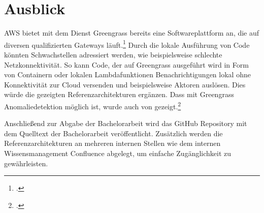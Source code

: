





\section{Ausblick}

\ac{AWS} bietet mit dem Dienst Greengrass bereits eine Softwareplattform an, die auf diversen qualifizierten Gateways läuft.\footcite[Vgl. auch im Folgenden][]{AmazonWebServicesInc..o.J.bu} Durch die lokale Ausführung von Code könnten Schwachstellen adressiert werden, wie beispielsweise schlechte Netzkonnektivität. So kann Code, der auf Greengrass ausgeführt wird in Form von Containern oder lokalen Lambdafunktionen Benachrichtigungen lokal ohne Konnektivität zur Cloud versenden und beispielsweise Aktoren auslösen. Dies würde die gezeigten Referenzarchitekturen ergänzen. Dass mit Greengrass Anomaliedetektion möglich ist, wurde auch von \citeauthor{Shankar.2020} gezeigt.\footcite[Vgl.][]{Shankar.2020}

Anschließend zur Abgabe der Bachelorarbeit wird das GitHub Repository mit dem Quelltext der Bachelorarbeit veröffentlicht. Zusätzlich werden die Referenzarchitekturen an mehreren internen Stellen wie dem internen Wissensmanagement Confluence abgelegt, um einfache Zugänglichkeit zu gewährleisten.

